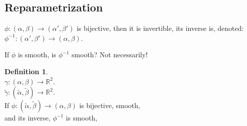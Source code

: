 \documentclass[twocolumn,20pt,fleqn]{extarticle}
\theoremstyle{plain}
\theoremstyle{definition}
\newtheorem*{definition}{Definition}
\theoremstyle{remark}
\begin{document}
\clearpage


\subsection{Reparametrization}
$\phi: (\alpha,\beta) \to (\alpha',\beta')$ is bijective, then it is invertible, its inverse is,
denoted: $\phi^{-1} : (\alpha',\beta') \to (\alpha,\beta)$.

If $\phi$ is smooth, is $\phi^{-1}$ smooth? Not necessarily!



\begin{definition}~\\
  $\gamma : (\alpha, \beta) \to \mathbb{R}^2$.\\
  $\tilde{\gamma} : (\tilde{\alpha}, \tilde{\beta}) \to \mathbb{R}^2$.\\
  If $\phi : (\tilde{\alpha}, \tilde{\beta})\to (\alpha, \beta)$ is bijective, smooth, \\and its inverse, $\phi^{-1}$ is smooth,\end{definition}


\newpage
\end{document}

